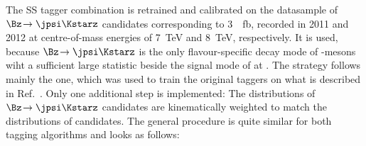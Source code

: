 The SS tagger combination is retrained and calibrated on the datasample of $\Bz\!\to\jpsi\Kstarz$ candidates corresponding to \SI{3}{\per\femto\barn}, recorded in \num{2011} and \num{2012} at centre-of-mass energies of \SI{7}{\tera\electronvolt} and \SI{8}{\tera\electronvolt}, respectively.
It is used, because $\Bz\!\to\jpsi\Kstarz$ is the only flavour-specific decay mode of \Bz-mesons wiht a sufficient large statistic beside the signal mode of \BdToDpi at \lhcb.
The strategy follows mainly the one, which was used to train the original taggers on \BdToDpi what is described in Ref.~\cite{Aaij:2016rdg}.
Only one additional step is implemented:
The distributions of $\Bz\!\to\jpsi\Kstarz$ candidates are kinematically weighted to match the distributions of \BdToDpi candidates.
The general procedure is quite similar for both tagging algorithms and looks as follows:
